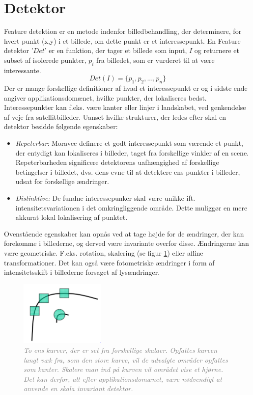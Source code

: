 \section{Detektor}\label{sec:detect}
Feature detektion er en metode indenfor billedbehandling, der determinere, for hvert punkt (x,y) i et billede, om dette punkt er et interessepunkt.  En Feature detektor '$Det$' er en funktion, der tager et billede som input, $I$ og returnere et subset af isolerede punkter, $p_i$ fra billedet, som er vurderet til at være interessante. 
$$ Det(I)=\lbrace p_1,p_2,...,p_n \rbrace$$
Der er mange forskellige definitioner af hvad et interessepunkt er og i sidste ende angiver applikationsdomænet, hvilke punkter, der lokaliseres bedst. Interessepunkter kan f.eks. være kanter eller linjer i landskabet, ved genkendelse af veje fra satellitbilleder. Uanset hvilke strukturer, der ledes efter skal en detektor besidde følgende egenskaber:
\begin{itemize}
\item{\emph{Repeterbar}: Moravec \cite{moravec} definere et godt interessepunkt som værende et punkt, der entydigt kan lokaliseres i billeder, taget fra forskellige vinkler af en scene. Repeterbarheden significere detektorens uafhængighed af forskellige betingelser i billedet, dvs. dens evne til at detektere ens punkter i billeder, udsat for forskellige ændringer. }
\item{\emph{Distinktive:}
De fundne interessepunker skal være unikke ift. intensitetsvariationen i det omkringliggende område. Dette muliggør en mere akkurat lokal lokalisering af punktet.}
\end{itemize}
Ovenstående egenskaber kan opnås ved at tage højde for de ændringer, der kan forekomme i billederne, og derved være invariante overfor disse. Ændringerne kan være geometriske. F.eks. rotation, skalering (se figur \ref{fig:skal}) eller affine transformationer. Det kan også være fotometriske ændringer i form af intensitetsskift i billederne forsaget af lysændringer.
\begin{figure}[H]
    \centering
    \includegraphics[width=0.37\textwidth]{fig/28.png}
     \vspace{-1em}
    \begin{center}    
       \caption{\textcolor{gray}{\footnotesize \textit{To ens kurver, der er set fra forskellige skalaer. Opfattes kurven langt væk fra, som den store kurve, vil de udvalgte områder opfattes som kanter. Skalere man ind på kurven vil området vise et hjørne. Det kan derfor, alt efter applikationsdomænet, være nødvendigt at anvende en skala invariant detektor.}}}
    \label{fig:skal}
     \end{center}
     \vspace{-2.5em}
  \end{figure} \noindent
